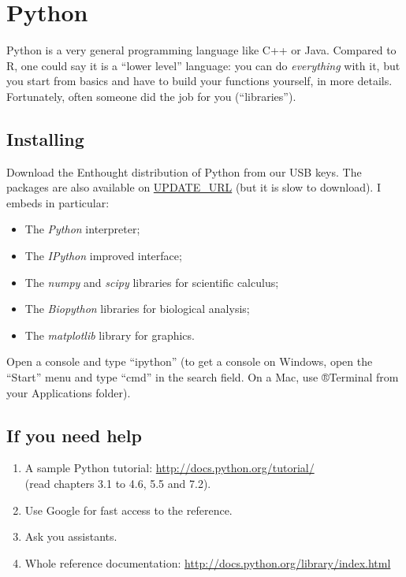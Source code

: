 \documentclass[a4paper,11pt]{article}
\begin{document}
\clearpage

\section{Python}

Python is a very general programming language like C++ or Java. Compared to R, one could say it is a ``lower level'' language:
you can do {\it everything} with it, but you start from basics and have to build your functions yourself, in more details.
Fortunately, often someone did the job for you (``libraries'').

\subsection{Installing}
Download the Enthought distribution of Python from our USB keys. The packages are also available on \url{UPDATE_URL} 
(but it is slow to download). I embeds in particular:
\begin{itemize}
\item The {\it Python} interpreter;
\item The {\it IPython} improved interface;
\item The {\it numpy} and {\it scipy} libraries for scientific calculus;
\item The {\it Biopython} libraries for biological analysis;
\item The {\it matplotlib} library for graphics.
\end{itemize}

Open a console and type ``ipython''
(to get a console on Windows, open the ``Start'' menu and type ``cmd'' in the search field. On a Mac, use ®Terminal 
from your Applications folder).

\subsection{If you need help}
\begin{enumerate}
\item A sample Python tutorial: \url{http://docs.python.org/tutorial/} \\(read chapters 3.1 to 4.6, 5.5 and 7.2).
\item Use Google for fast access to the reference.
\item Ask you assistants.
\item Whole reference documentation: \url{http://docs.python.org/library/index.html}
\end{enumerate}
\end{document}
